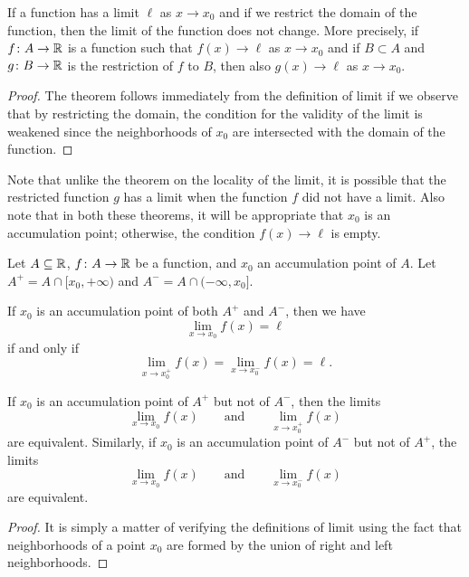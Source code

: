 \begin{theorem}
If a function has a limit $\ell$ as $x\to x_0$ 
and if we restrict the domain of the function, 
then the limit of the function does not change. 
More precisely,
if $f\colon A \to {\mathbb R}$ is a function such that $f(x)\to \ell$ as $x\to x_0$
and if $B \subset A$ and $g\colon B\to {\mathbb R}$ is the restriction of $f$ 
to $B$, then also $g(x)\to \ell$ as $x\to x_0$. 
\end{theorem}
%
\begin{proof}
The theorem follows immediately from the definition of limit if we observe
that by restricting the domain, the condition for the validity of the limit is
weakened
since the neighborhoods of $x_0$ are intersected with the domain of the
function.
\end{proof}

Note that unlike the theorem on the locality of the limit, it is
possible that the restricted function $g$ has a limit when the function
$f$ did not have a limit.
Also note that in both these theorems, it will be appropriate 
that $x_0$ is an accumulation point; otherwise, the condition $f(x)\to \ell$ 
is empty.

\begin{theorem}%
\mymark{*}%
Let $A\subseteq {\mathbb R}$, $f\colon A \to {\mathbb R}$ be a function, and $x_0$ an accumulation
point
of $A$. Let $A^+ = A \cap [x_0,+\infty)$ and $A^- = A \cap (-\infty, x_0]$.

If $x_0$ is an accumulation point of both $A^+$ and $A^-$,
then we have
\[
  \lim_{x\to x_0} f(x) = \ell
\]
if and only if
\[
  \lim_{x\to x_0^+} f(x) = \lim_{x\to x_0^-} f(x) = \ell.
\]

If $x_0$ is an accumulation point of $A^+$ but not of $A^-$, then
the limits
\[
  \lim_{x\to x_0} f(x) \qquad \text{and}\qquad \lim_{x\to x_0^+} f(x)
\]
are equivalent. Similarly, if $x_0$ is an accumulation point
of $A^-$ but not of $A^+$, the limits
\[
  \lim_{x\to x_0} f(x) \qquad \text{and}\qquad \lim_{x\to x_0^-} f(x)
\]
are equivalent.
\end{theorem}
%
\begin{proof}
It is simply a matter of verifying the definitions of limit using the fact that
neighborhoods of a point $x_0$ are formed by the union of right and left
neighborhoods.
\end{proof}

